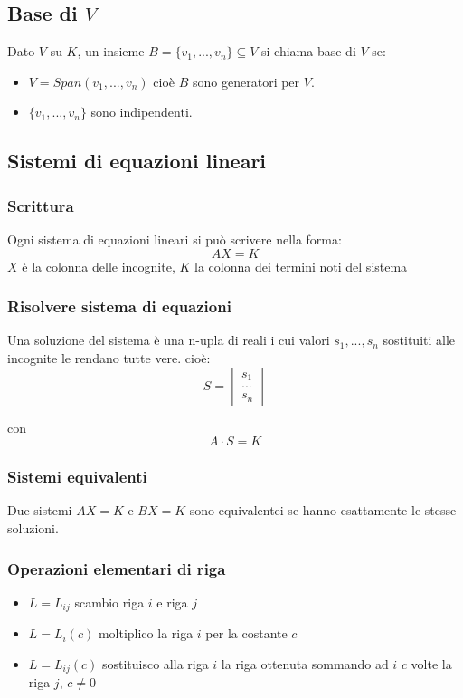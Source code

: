 \subsection{Base di \(V\)}
Dato \(V\) su \(K\), un insieme \(B=\{v_1,...,v_n\}\subseteq V\) si chiama base di \(V\) se:
\begin{itemize}

	\item \(V=Span(v_1,...,v_n)\) cioè \(B\) sono generatori per \(V\).

	\item \(\{v_1,...,v_n\}\) sono indipendenti.

\end{itemize}

\subsection{Sistemi di equazioni lineari}

\subsubsection{Scrittura}
Ogni sistema di equazioni lineari si può scrivere nella forma:
\[AX=K\]
\(X\) è la colonna delle incognite, \(K\) la colonna dei termini noti del sistema

\subsubsection{Risolvere sistema di equazioni}
Una soluzione del sistema è una n-upla di reali i cui valori \(s_1,...,s_n\) sostituiti alle incognite le rendano tutte vere. cioè:
\begin{equation*}
	S = 
		\begin{bmatrix}
		s_1 \\
		...\\
		s_n
		\end{bmatrix}
\end{equation*}

con 
\[A\cdot S=K\]

\subsubsection{Sistemi equivalenti}
Due sistemi \(AX=K\) e \(BX=K\) sono equivalentei se hanno esattamente le stesse soluzioni.

\subsubsection{Operazioni elementari di riga}
\begin{itemize}

	\item \(L=L_{ij}\) scambio riga \(i\) e riga \(j\)
	\item \(L=L_i(c)\) moltiplico la riga \(i\) per la costante \(c\)
	\item \(L=L_{ij}(c)\) sostituisco alla riga \(i\) la riga ottenuta sommando ad \(i\) \(c\) volte la riga \(j\), \(c\neq 0\)

\end{itemize}

